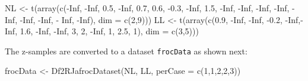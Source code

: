 \documentclass[
]{book}
\newenvironment{Shaded}{\begin{snugshade}}{\end{snugshade}}
\newcommand{\AttributeTok}[1]{\textcolor[rgb]{0.77,0.63,0.00}{#1}}
\newcommand{\ConstantTok}[1]{\textcolor[rgb]{0.00,0.00,0.00}{#1}}
\newcommand{\DecValTok}[1]{\textcolor[rgb]{0.00,0.00,0.81}{#1}}
\newcommand{\FloatTok}[1]{\textcolor[rgb]{0.00,0.00,0.81}{#1}}
\newcommand{\FunctionTok}[1]{\textcolor[rgb]{0.00,0.00,0.00}{#1}}
\newcommand{\NormalTok}[1]{#1}
\newcommand{\OtherTok}[1]{\textcolor[rgb]{0.56,0.35,0.01}{#1}}
\newcommand{\SpecialCharTok}[1]{\textcolor[rgb]{0.00,0.00,0.00}{#1}}
\begin{document}
\begin{Shaded}
\begin{Highlighting}[]
\NormalTok{NL }\OtherTok{\textless{}{-}} \FunctionTok{t}\NormalTok{(}\FunctionTok{array}\NormalTok{(}\FunctionTok{c}\NormalTok{(}\SpecialCharTok{{-}}\ConstantTok{Inf}\NormalTok{, }\SpecialCharTok{{-}}\ConstantTok{Inf}\NormalTok{,  }
                 \FloatTok{0.5}\NormalTok{, }\SpecialCharTok{{-}}\ConstantTok{Inf}\NormalTok{, }
                 \FloatTok{0.7}\NormalTok{, }\FloatTok{0.6}\NormalTok{, }
                \SpecialCharTok{{-}}\FloatTok{0.3}\NormalTok{, }\SpecialCharTok{{-}}\ConstantTok{Inf}\NormalTok{, }
                 \FloatTok{1.5}\NormalTok{, }\SpecialCharTok{{-}}\ConstantTok{Inf}\NormalTok{, }
                \SpecialCharTok{{-}}\ConstantTok{Inf}\NormalTok{, }\SpecialCharTok{{-}}\ConstantTok{Inf}\NormalTok{, }
                \SpecialCharTok{{-}}\ConstantTok{Inf}\NormalTok{, }\SpecialCharTok{{-}}\ConstantTok{Inf}\NormalTok{, }
                \SpecialCharTok{{-}}\ConstantTok{Inf}\NormalTok{, }\SpecialCharTok{{-}}\ConstantTok{Inf}\NormalTok{,}
              \SpecialCharTok{{-}}  \ConstantTok{Inf}\NormalTok{, }\SpecialCharTok{{-}}\ConstantTok{Inf}\NormalTok{), }\AttributeTok{dim =} \FunctionTok{c}\NormalTok{(}\DecValTok{2}\NormalTok{,}\DecValTok{9}\NormalTok{)))}
\NormalTok{LL }\OtherTok{\textless{}{-}} \FunctionTok{t}\NormalTok{(}\FunctionTok{array}\NormalTok{(}\FunctionTok{c}\NormalTok{(}\FloatTok{0.9}\NormalTok{, }\SpecialCharTok{{-}}\ConstantTok{Inf}\NormalTok{, }\SpecialCharTok{{-}}\ConstantTok{Inf}\NormalTok{, }
               \SpecialCharTok{{-}}\FloatTok{0.2}\NormalTok{, }\SpecialCharTok{{-}}\ConstantTok{Inf}\NormalTok{,}\SpecialCharTok{{-}}\ConstantTok{Inf}\NormalTok{, }
                \FloatTok{1.6}\NormalTok{, }\SpecialCharTok{{-}}\ConstantTok{Inf}\NormalTok{, }\SpecialCharTok{{-}}\ConstantTok{Inf}\NormalTok{, }
                  \DecValTok{3}\NormalTok{,    }\DecValTok{2}\NormalTok{, }\SpecialCharTok{{-}}\ConstantTok{Inf}\NormalTok{, }
                  \DecValTok{1}\NormalTok{,    }\FloatTok{2.5}\NormalTok{,  }\DecValTok{1}\NormalTok{), }\AttributeTok{dim =} \FunctionTok{c}\NormalTok{(}\DecValTok{3}\NormalTok{,}\DecValTok{5}\NormalTok{)))}
\end{Highlighting}
\end{Shaded}

The z-samples are converted to a dataset \texttt{frocData} as shown next:

\begin{Shaded}
\begin{Highlighting}[]
\NormalTok{frocData }\OtherTok{\textless{}{-}} \FunctionTok{Df2RJafrocDataset}\NormalTok{(NL, LL, }\AttributeTok{perCase =} \FunctionTok{c}\NormalTok{(}\DecValTok{1}\NormalTok{,}\DecValTok{1}\NormalTok{,}\DecValTok{2}\NormalTok{,}\DecValTok{2}\NormalTok{,}\DecValTok{3}\NormalTok{))}
\end{Highlighting}
\end{Shaded}
\end{document}
